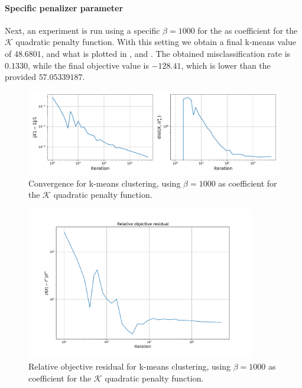 \documentclass[12pt]{article}
\begin{document}
\paragraph{Specific penalizer parameter}
Next, an experiment is run using a specific $\beta = 1000$ for the as coefficient for the $\mathcal{K}$ quadratic penalty function. With this setting we obtain a final k-means value of $48.6801$, and what is plotted in ,  and . The obtained misclassification rate is $0.1330$, while the final objective value is $-128.41$, which is lower than the provided $57.05339187$.

\begin{figure}[ht]
    \centering
    \includegraphics[width=17cm]{hw4/code/part3/results/beta/convergence.pdf}
    \caption{Convergence for k-means clustering, using $\beta = 1000$ as coefficient for the $\mathcal{K}$ quadratic penalty function.}
    \label{fig:beta-convergence}
\end{figure}
\begin{figure}[ht]
    \centering
    \includegraphics[width=10cm]{hw4/code/part3/results/beta/relative_objective_residual.pdf}
    \caption{Relative objective residual for k-means clustering, using $\beta = 1000$ as coefficient for the $\mathcal{K}$ quadratic penalty function.}
    \label{fig:beta-relative-obj-res}
\end{figure}
\end{document}
